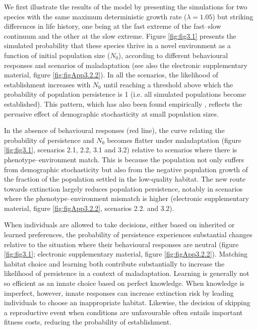 We first illustrate the results of the model by presenting the
simulations for two species with the same maximum deterministic
growth rate ($\lambda = 1.05$) but striking differences in life
history, one being at the fast extreme of the fast–slow continuum
and the other at the slow extreme. Figure \ref{fig:fig3.1} presents
the simulated probability that these species thrive in a novel
environment as a function of initial population size ($N_{0}$),
according to different behavioural responses and scenarios of
maladaptation (see also the electronic supplementary material,
figure \ref{fig:figApp3.2.2}). In all the scenarios, the likelihood of establishment
increases with $N_{0}$ until reaching a threshold above which the
probability of population persistence is 1 (i.e. all simulated
populations become established). This pattern, which has
also been found empirically \citep{Blackburn2013, Sol2013}, reflects the pervasive
effect of demographic stochasticity at small population sizes.

In the absence of behavioural responses (red line), the curve
relating the probability of persistence and $N_{0}$ becomes flatter
under maladaptation (figure \ref{fig:fig3.1}, scenarios 2.1, 2.2, 3.1 and 3.2)
relative to scenarios where there is phenotype–environment
match. This is because the population not only suffers from
demographic stochasticity but also from the negative population
growth of the fraction of the population settled in the
low-quality habitat. The new route towards extinction largely
reduces population persistence, notably in scenarios where
the phenotype–environment mismatch is higher (electronic
supplementary material, figure \ref{fig:figApp3.2.2}, scenarios 2.2. and 3.2).

When individuals are allowed to take decisions, either
based on inherited or learned preferences, the probability of
persistence experiences substantial changes relative to the situation
where their behavioural responses are neutral (figure \ref{fig:fig3.1};
electronic supplementary material, figure \ref{fig:figApp3.2.2}). Matching
habitat choice and learning both contribute substantially to
increase the likelihood of persistence in a context of maladaptation.
Learning is generally not so efficient as an innate choice
based on perfect knowledge. When knowledge is imperfect,
however, innate responses can increase extinction risk by leading
individuals to choose an inappropriate habitat. Likewise,
the decision of skipping a reproductive event when conditions
are unfavourable often entails important fitness costs, reducing
the probability of establishment.


